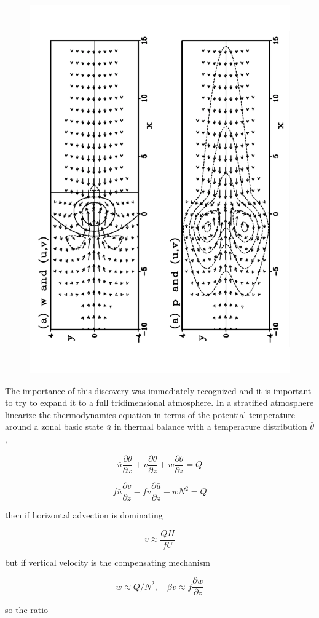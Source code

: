 \begin{figure}
\centering
\includegraphics[width = .7 \textwidth]{figs/GD/Gill.png}
\caption{}
\end{figure}

The importance of this discovery was immediately recognized and it is
important to try to expand it to a full tridimensional atmosphere. In a
stratified atmosphere linearize the thermodynamics equation in terms of
the potential temperature around a zonal basic state \(\bar{u}\) in
thermal balance with a temperature distribution \(\bar{\theta}\),

\[\bar{u}\frac{\partial \theta}{\partial x} + v\frac{\partial \bar{\theta}}{\partial z} + w \frac{\partial \bar{\theta}}{\partial z}  = Q\]


\[f \bar{u}\frac{\partial v}{\partial z} - f v\frac{\partial \bar{u}}{\partial z} + w N^2  = Q\]

then if horizontal advection is dominating

\[v \approx \frac{Q H}{f U}\]

but if vertical velocity is the compensating mechanism

\[w \approx Q/N^2, \quad \beta v \approx f \frac{\partial w}{\partial z}\]

so the ratio

